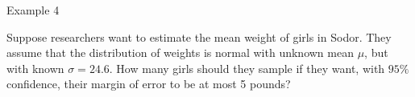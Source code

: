 \documentclass[
  ignorenonframetext,
]{beamer}
\begin{document}
\begin{frame}{Example 4}
\protect\hypertarget{example-4}{}
\begin{tcolorbox}
Suppose researchers want to estimate the mean weight of girls in Sodor. They assume that the distribution of weights is normal with unknown mean $\mu$, but with known $\sigma=24.6$. How many girls should they sample if they want, with $95\%$ confidence, their margin of error to be at most 5 pounds?
\end{tcolorbox}

\begin{tcolorbox}


\vspace{30mm}

\end{tcolorbox}
\end{frame}
\end{document}
